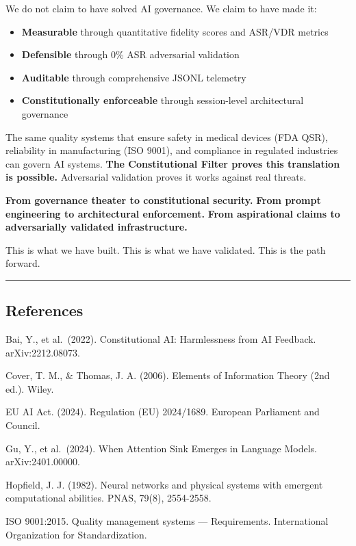 We do not claim to have solved AI governance. We claim to have made it:

\begin{itemize}
\tightlist
\item
  \textbf{Measurable} through quantitative fidelity scores and ASR/VDR
  metrics
\item
  \textbf{Defensible} through 0\% ASR adversarial validation
\item
  \textbf{Auditable} through comprehensive JSONL telemetry
\item
  \textbf{Constitutionally enforceable} through session-level
  architectural governance
\end{itemize}

The same quality systems that ensure safety in medical devices (FDA
QSR), reliability in manufacturing (ISO 9001), and compliance in
regulated industries can govern AI systems. \textbf{The Constitutional
Filter proves this translation is possible.} Adversarial validation
proves it works against real threats.

\textbf{From governance theater to constitutional security.}
\textbf{From prompt engineering to architectural enforcement.}
\textbf{From aspirational claims to adversarially validated
infrastructure.}

This is what we have built. This is what we have validated. This is the
path forward.

\begin{center}\rule{0.5\linewidth}{0.5pt}\end{center}

\subsection{References}\label{references}

Bai, Y., et al.~(2022). Constitutional AI: Harmlessness from AI
Feedback. arXiv:2212.08073.

Cover, T. M., \& Thomas, J. A. (2006). Elements of Information Theory
(2nd ed.). Wiley.

EU AI Act. (2024). Regulation (EU) 2024/1689. European Parliament and
Council.

Gu, Y., et al.~(2024). When Attention Sink Emerges in Language Models.
arXiv:2401.00000.

Hopfield, J. J. (1982). Neural networks and physical systems with
emergent computational abilities. PNAS, 79(8), 2554-2558.

ISO 9001:2015. Quality management systems --- Requirements.
International Organization for Standardization.

